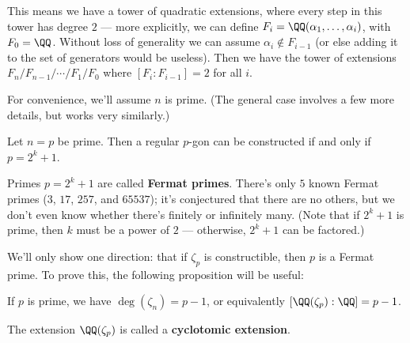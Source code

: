 This means we have a tower of quadratic extensions, where every step in this tower has degree $2$ --- more explicitly, we can define $F_i = \QQ(\alpha_1, \ldots, \alpha_i)$, with $F_0 = \QQ$. Without loss of generality we can assume $\alpha_i \not\in F_{i - 1}$ (or else adding it to the set of generators would be useless). Then we have the tower of extensions $F_n/F_{n - 1}/\cdots/F_1/F_0$ where $[F_i : F_{i - 1}] = 2$ for all $i$. 

For convenience, we'll assume $n$ is prime. (The general case involves a few more details, but works very similarly.)

\begin{theorem}\label{constructible}
    Let $n = p$ be prime. Then a regular $p$-gon can be constructed if and only if $p = 2^k + 1$. 
\end{theorem}

Primes $p = 2^k + 1$ are called \textbf{Fermat primes}. There's only $5$ known Fermat primes ($3$, $17$, $257$, and $65537$); it's conjectured that there are no others, but we don't even know whether there's finitely or infinitely many. (Note that if $2^k + 1$ is prime, then $k$ must be a power of $2$ --- otherwise, $2^k + 1$ can be factored.) 

We'll only show one direction: that if $\zeta_p$ is constructible, then $p$ is a Fermat prime. To prove this, the following proposition will be useful: 

\begin{proposition}
    If $p$ is prime, we have $\deg(\zeta_n) = p - 1$, or equivalently $[\QQ(\zeta_p) : \QQ] = p - 1$. 
\end{proposition}

The extension $\QQ(\zeta_p)$ is called a \textbf{cyclotomic extension}. 

